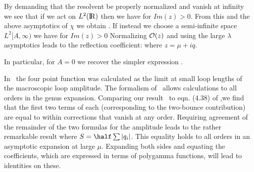 By demanding that the resolvent be properly normalized and vanish at
infinity we see that if we act on $L^2(\relax{\rm I\kern-.18em R})$ then we have
\eqn{}
 for $Im(z)>0$.
 From this and the above asymptotics of $\chi$ we obtain \gmfrm.
 If instead we choose a semi-infinite
space $L^2[A,\infty)$ we have for $Im(z)>0$
\eqn{}
 Normalizing ${\cal O}(z)$ and using the large $\lambda$ 
asymptotics leads to
the reflection coefficient:
 \eqn{}
where $z = \mu + iq$. 
 
In particular, for $A=0$ we recover the simpler expression \gamhf.
 
 
In \moore\ the four point function was calculated as the limit at small loop
lengths of the macroscopic loop amplitude. The formalism of \moore\ allows
calculations to all orders in the genus expansion.
Comparing our result \twotwo\ to eqn. (4.38) of \moore ,we find that 
the first two terms of each (corresponding to the two-bounce contribution) are
equal to within corrections that vanish at any order.
Requiring agreement of the remainder of the two formulas for the amplitude
leads to the rather remarkable result
\eqn{}
where $S = \half \sum |q_i|$. This equality holds to all orders in an
asymptotic expansion at large $\mu$. Expanding both sides and equating
the coefficients, which are expressed in terms of polygamma functions, will
lead to identities on these. 
 
